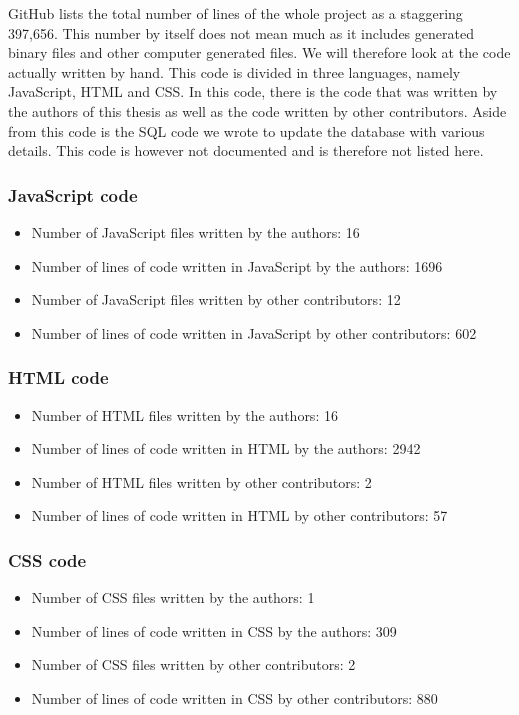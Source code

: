\documentclass{eplmastersthesis}
\begin{document}
GitHub lists the total number of lines of the whole project as a staggering 397,656. This number by itself does not mean much as it includes generated binary files and other computer generated files. We will therefore look at the code actually written by hand. This code is divided in three languages, namely JavaScript, HTML and CSS. In this code, there is the code that was written by the authors of this thesis as well as the code written by other contributors. Aside from this code is the SQL code we wrote to update the database with various details. This code is however not documented and is therefore not listed here.

\subsubsection{JavaScript code}

\begin{itemize}
\item Number of JavaScript files written by the authors: 16
\item Number of lines of code written in JavaScript by the authors: 1696
\item Number of JavaScript files written by other contributors: 12
\item Number of lines of code written in JavaScript by other contributors: 602
\end{itemize}

\subsubsection{HTML code}

\begin{itemize}
\item Number of HTML files written by the authors: 16
\item Number of lines of code written in HTML by the authors: 2942
\item Number of HTML files written by other contributors: 2
\item Number of lines of code written in HTML by other contributors: 57
\end{itemize}

\subsubsection{CSS code}

\begin{itemize}
\item Number of CSS files written by the authors: 1
\item Number of lines of code written in CSS by the authors: 309
\item Number of CSS files written by other contributors: 2
\item Number of lines of code written in CSS by other contributors: 880
\end{itemize}
\end{document}

